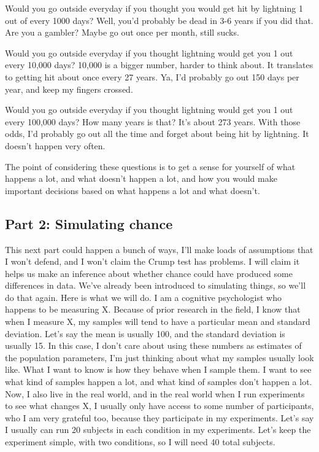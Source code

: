 \documentclass[
  letterpaper,
  DIV=11,
  numbers=noendperiod]{scrreprt}
\begin{document}
Would you go outside everyday if you thought you would get hit by
lightning 1 out of every 1000 days? Well, you'd probably be dead in 3-6
years if you did that. Are you a gambler? Maybe go out once per month,
still sucks.

Would you go outside everyday if you thought lightning would get you 1
out every 10,000 days? 10,000 is a bigger number, harder to think about.
It translates to getting hit about once every 27 years. Ya, I'd probably
go out 150 days per year, and keep my fingers crossed.

Would you go outside everyday if you thought lightning would get you 1
out every 100,000 days? How many years is that? It's about 273 years.
With those odds, I'd probably go out all the time and forget about being
hit by lightning. It doesn't happen very often.

The point of considering these questions is to get a sense for yourself
of what happens a lot, and what doesn't happen a lot, and how you would
make important decisions based on what happens a lot and what doesn't.

\subsection{Part 2: Simulating chance}\label{part-2-simulating-chance}

This next part could happen a bunch of ways, I'll make loads of
assumptions that I won't defend, and I won't claim the Crump test has
problems. I will claim it helps us make an inference about whether
chance could have produced some differences in data. We've already been
introduced to simulating things, so we'll do that again. Here is what we
will do. I am a cognitive psychologist who happens to be measuring X.
Because of prior research in the field, I know that when I measure X, my
samples will tend to have a particular mean and standard deviation.
Let's say the mean is usually 100, and the standard deviation is usually
15. In this case, I don't care about using these numbers as estimates of
the population parameters, I'm just thinking about what my samples
usually look like. What I want to know is how they behave when I sample
them. I want to see what kind of samples happen a lot, and what kind of
samples don't happen a lot. Now, I also live in the real world, and in
the real world when I run experiments to see what changes X, I usually
only have access to some number of participants, who I am very grateful
too, because they participate in my experiments. Let's say I usually can
run 20 subjects in each condition in my experiments. Let's keep the
experiment simple, with two conditions, so I will need 40 total
subjects.
\end{document}
